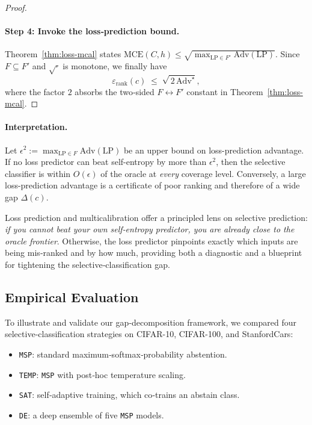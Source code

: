 \begin{proof}
\paragraph{Step 4:  Invoke the loss‑prediction bound.}
Theorem~\ref{thm:loss-mcal} states
\(
\mathrm{MCE}(C,h)
\le
\sqrt{\max_{\mathrm{LP}\in F'}\mathrm{Adv}(\mathrm{LP})}.
\)
Since \(F\subseteq F'\) and \(\sqrt{\cdot}\) is monotone, we finally have
\begin{equation}
\varepsilon_{\text{rank}}(c)
\;\le\;
\sqrt{\,2\,\mathrm{Adv}^{\star}},
\end{equation}
where the factor \(2\) absorbs the two‑sided
\(F\leftrightarrow F'\) constant in
Theorem~\ref{thm:loss-mcal}.
\end{proof}

\paragraph{Interpretation.}
Let \(\epsilon^2 := \max_{\mathrm{LP}\in F}\mathrm{Adv}(\mathrm{LP})\) be an upper bound on loss-prediction advantage.  
If no loss predictor can beat self-entropy by more than \(\epsilon^2\), then the selective classifier is within \(O(\epsilon)\) of the oracle at \emph{every} coverage level.  
Conversely, a large loss-prediction advantage is a certificate of poor ranking and therefore of a wide gap \(\Delta(c)\).

\begin{takeaway}
Loss prediction and multicalibration offer a principled lens on
selective prediction: \emph{if you cannot beat your own self‑entropy
predictor, you are already close to the oracle frontier}.  Otherwise,
the loss predictor pinpoints exactly which inputs are being mis‑ranked
and by how much, providing both a diagnostic and a blueprint for
tightening the selective‑classification gap.
\end{takeaway}

\subsection{Empirical Evaluation}
\label{sec:adv_experiments}

To illustrate and validate our gap‐decomposition framework, we compared four selective‐classification strategies on CIFAR-10, CIFAR-100, and StanfordCars:

\begin{itemize}[leftmargin=1.2em]
  \item \texttt{MSP}: standard maximum‐softmax‐probability abstention.
  \item \texttt{TEMP}: \texttt{MSP} with post‐hoc temperature scaling.
  \item \texttt{SAT}: self‐adaptive training, which co‐trains an abstain class.
  \item \texttt{DE}: a deep ensemble of five \texttt{MSP} models.
\end{itemize}

